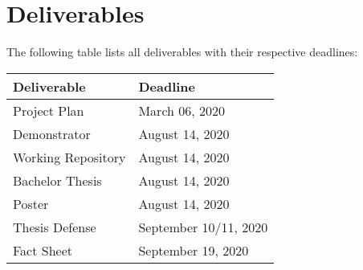 \chapter{Deliverables}
\label{ch:deliverables}

The following table lists all deliverables with their respective deadlines:\\

\begin{tabularx}{\textwidth}{Xl}
  \toprule
  \textbf{Deliverable} & \textbf{Deadline} \\
  \midrule
  Project Plan & March 06, 2020 \\
  Demonstrator & August 14, 2020 \\
  Working Repository & August 14, 2020 \\
  Bachelor Thesis & August 14, 2020 \\
  Poster & August 14, 2020 \\
  Thesis Defense & September 10/11, 2020 \\
  Fact Sheet & September 19, 2020 \\
  \bottomrule
\end{tabularx}

